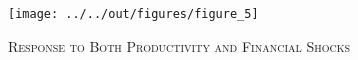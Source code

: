 \begin{figure}[t]
	\begin{center}
	    \texttt{[image: ../../out/figures/figure\_5]}
	    \caption{\textsc{Response to Both Productivity and Financial Shocks}}
	    \label{fig:figure_5}
    \end{center}
\end{figure}
